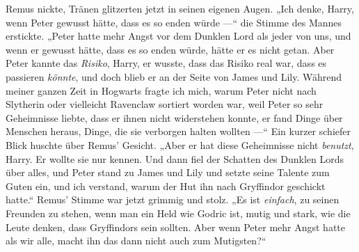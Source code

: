 Remus nickte, Tränen glitzerten jetzt in seinen eigenen Augen.
„Ich denke, Harry, wenn Peter gewusst hätte, dass es so enden würde —“ die Stimme des Mannes erstickte. „Peter hatte mehr Angst vor dem Dunklen Lord als jeder von uns, und wenn er gewusst hätte, dass es so enden würde, hätte er es nicht getan. Aber Peter kannte das \emph{Risiko}, Harry, er wusste, dass das Risiko real war, dass es passieren \emph{könnte}, und doch blieb er an der Seite von James und Lily. Während meiner ganzen Zeit in Hogwarts fragte ich mich, warum Peter nicht nach Slytherin oder vielleicht Ravenclaw sortiert worden war, weil Peter so sehr Geheimnisse liebte, dass er ihnen nicht widerstehen konnte, er fand Dinge über Menschen heraus, Dinge, die sie verborgen halten wollten —“ Ein kurzer schiefer Blick huschte über Remus’ Gesicht. „Aber er hat diese Geheimnisse nicht \emph{benutzt}, Harry. Er wollte sie nur kennen. Und dann fiel der Schatten des Dunklen Lords über alles, und Peter stand zu James und Lily und setzte seine Talente zum Guten ein, und ich verstand, warum der Hut ihn nach Gryffindor geschickt hatte.“ Remus’ Stimme war jetzt grimmig und stolz.
„Es ist \emph{einfach}, zu seinen Freunden zu stehen, wenn man ein Held wie Godric ist, mutig und stark, wie die Leute denken, dass Gryffindors sein sollten. Aber wenn Peter mehr Angst hatte als wir alle, macht ihn das dann nicht auch zum Mutigsten?“

